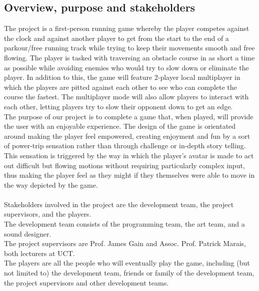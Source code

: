 \documentclass[a4paper,10pt]{article}
\begin{document}
\subsection{Overview, purpose and stakeholders}
The project is a first-person running game whereby the player competes against the clock and against another player to get from the start to the end of a parkour/free running track while trying to keep their movements smooth and free flowing. The player is tasked with traversing an obstacle course in as short a time as possible while avoiding enemies who would try to slow down or eliminate the player. In addition to this, the game will feature 2-player local multiplayer in which the players are pitted against each other to see who can complete the course the fastest. The multiplayer mode will also allow players to interact with each other, letting players try to slow their opponent down to get an edge. \\
The purpose of our project is to complete a game that, when played, will provide the user with an enjoyable experience. The design of the game is orientated around making the player feel empowered, creating enjoyment and fun by a sort of power-trip sensation rather than through challenge or in-depth story telling. This sensation is triggered by the way in which the player's avatar is made to act out difficult but flowing motions without requiring particularly complex input, thus making the player feel as they might if they themselves were able to move in the way depicted by the game.
\\ \\
Stakeholders involved in the project are the development team, the project supervisors, and the players. \\
The development team consists of the programming team, the art team, and a sound designer. \\
The project supervisors are Prof. James Gain and Assoc. Prof. Patrick Marais, both lecturers at UCT. \\
The players are all the people who will eventually play the game, including (but not limited to) the development team, friends or family of the development team, the project supervisors and other development teams.
\end{document}
